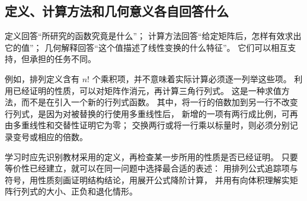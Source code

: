\documentclass[UTF8,12pt,a4paper,fontset=fandol]{ctexart}
\begin{document}
\subsection{定义、计算方法和几何意义各自回答什么}

定义回答“所研究的函数究竟是什么”；
计算方法回答“给定矩阵后，怎样有效求出它的值”；
几何解释回答“这个值描述了线性变换的什么特征”。
它们可以相互支持，但承担的任务不同。

例如，排列定义含有 $n!$ 个乘积项，并不意味着实际计算必须逐一列举这些项。
利用已经证明的性质，可以对矩阵作消元，再计算三角行列式。
这是一种求值方法，而不是在引入一个新的行列式函数。
其中，将一行的倍数加到另一行不改变行列式，是因为对被替换的行使用多重线性后，
新增的一项有两行成比例，可再由多重线性和交替性证明它为零；
交换两行或将一行乘以标量时，则必须分别记录变号或相应的倍数。

学习时应先识别教材采用的定义，再检查某一步所用的性质是否已经证明。
只要等价性已经建立，就可以在同一问题中选择最合适的表述：
用排列公式追踪项与符号，用性质刻画证明结构结论，用展开公式降阶计算，
并用有向体积理解实矩阵行列式的大小、正负和退化情形。
\end{document}
